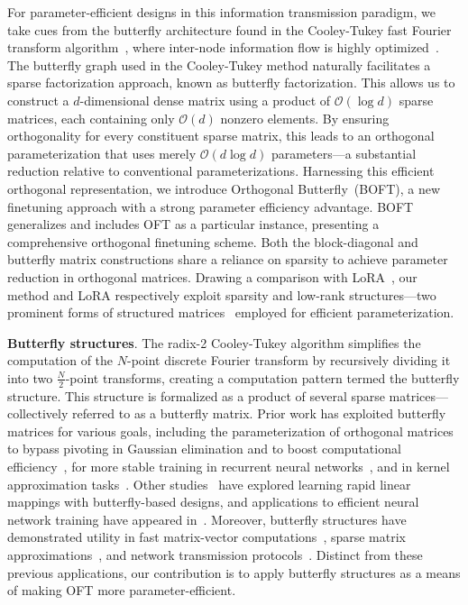 For parameter-efficient designs in this information transmission paradigm, we take cues from the butterfly architecture found in the Cooley-Tukey fast Fourier transform algorithm~\cite{cooley1965algorithm}, where inter-node information flow is highly optimized~\cite{klasing1994broadcasting}. The butterfly graph used in the Cooley-Tukey method naturally facilitates a sparse factorization approach, known as butterfly factorization. This allows us to construct a $d$-dimensional dense matrix using a product of $\mathcal{O}(\log d)$ sparse matrices, each containing only $\mathcal{O}(d)$ nonzero elements. By ensuring orthogonality for every constituent sparse matrix, this leads to an orthogonal parameterization that uses merely $\mathcal{O}(d\log d)$ parameters—a substantial reduction relative to conventional parameterizations. Harnessing this efficient orthogonal representation, we introduce Orthogonal Butterfly~(BOFT), a new finetuning approach with a strong parameter efficiency advantage. BOFT generalizes and includes OFT as a particular instance, presenting a comprehensive orthogonal finetuning scheme. Both the block-diagonal and butterfly matrix constructions share a reliance on sparsity to achieve parameter reduction in orthogonal matrices. Drawing a comparison with LoRA~\cite{hulora2022}, our method and LoRA respectively exploit sparsity and low-rank structures—two prominent forms of structured matrices~\cite{candes2011robust} employed for efficient parameterization.

\textbf{Butterfly structures}. The radix-2 Cooley-Tukey algorithm simplifies the computation of the $N$-point discrete Fourier transform by recursively dividing it into two $\frac{N}{2}$-point transforms, creating a computation pattern termed the butterfly structure. This structure is formalized as a product of several sparse matrices—collectively referred to as a butterfly matrix. Prior work has exploited butterfly matrices for various goals, including the parameterization of orthogonal matrices to bypass pivoting in Gaussian elimination and to boost computational efficiency~\cite{parker1995random}, for more stable training in recurrent neural networks~\cite{jing2017tunable}, and in kernel approximation tasks~\cite{munkhoeva2018quadrature}. Other studies~\cite{dao2019learning,dao2019kaleidoscope} have explored learning rapid linear mappings with butterfly-based designs, and applications to efficient neural network training have appeared in~\cite{chen2022pixelated,dao2022monarch}. Moreover, butterfly structures have demonstrated utility in fast matrix-vector computations~\cite{michielssen1996multilevel,o2010algorithm}, sparse matrix approximations~\cite{li2015butterfly}, and network transmission protocols~\cite{klasing1994broadcasting,li2003linear,rajasingh2016transmission}. Distinct from these previous applications, our contribution is to apply butterfly structures as a means of making OFT more parameter-efficient.

